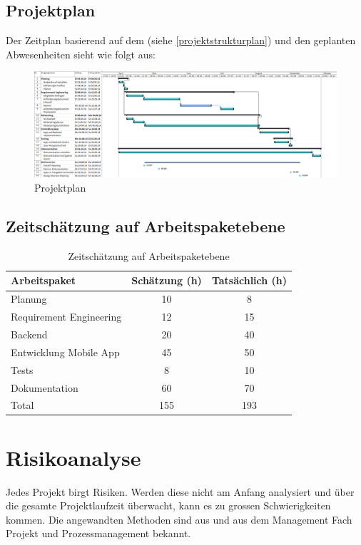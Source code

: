 \begin{landscape}
\thispagestyle{empty}
\subsection{Projektplan}\label{projektplan}
Der Zeitplan basierend auf dem  (siehe \ref{projektstrukturplan})  und den geplanten Abwesenheiten sieht wie folgt aus:
\begin{figure}[h]
\centering
\includegraphics[scale=0.5]{images/project/projectplan.png}
\caption{Projektplan}
\label{fig:psp}
\end{figure}

\end{landscape}

\subsection{Zeitschätzung auf Arbeitspaketebene}
\begin{table}[ht]
\centering
  \begin{tabular}{ l | c | c }
	\hline
	\rowcolor{gray}
	Arbeitspaket							&	Schätzung (h)	& Tatsächlich (h)	\\ \hline
	Planung							&	10			& 8	\\ \hline
	Requirement Engineering					&	12			& 15	\\ \hline
	\glossarmark{Refactoring} Backend					&	20			& 40	\\ \hline
	Entwicklung Mobile App					&	45			& 50	\\ \hline
	Tests								&	8			& 10	\\ \hline
	Dokumentation						&	60			& 70	\\ \hline \hline
	Total								&	155			& 193	\\ \hline
  \end{tabular}
   \caption{Zeitschätzung auf Arbeitspaketebene}\label{table:time_estimation}
\end{table}

\section{Risikoanalyse}\label{risikoanalyse}
Jedes Projekt birgt Risiken. Werden diese nicht am Anfang analysiert und über die gesamte Projektlaufzeit überwacht, kann es zu grossen Schwierigkeiten kommen. Die angewandten Methoden sind aus \cite{proj_mgmt_book} und aus dem Management Fach Projekt und Prozessmanagement bekannt.

